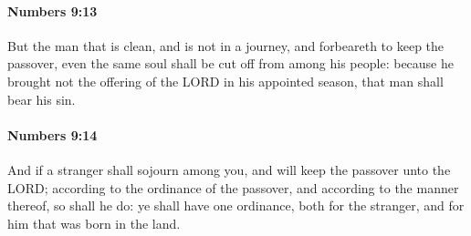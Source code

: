 		\paragraph{Numbers 9:13} %
			\label{NUMBERS-9-13}

			But the man that is clean, and is not in a journey, and forbeareth to keep the passover, even the same soul shall be cut off from among his people: because he brought not the offering of the LORD in his appointed season, that man shall bear his sin.


		\paragraph{Numbers 9:14} %
			\label{NUMBERS-9-14}

			And if a stranger shall sojourn among you, and will keep the passover unto the LORD; according to the ordinance of the passover, and according to the manner thereof, so shall he do: ye shall have one ordinance, both for the stranger, and for him that was born in the land.

